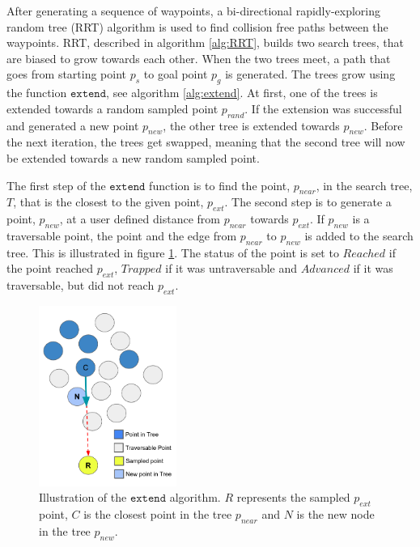After generating a sequence of waypoints, a bi-directional rapidly-exploring random tree (RRT) algorithm is used to find collision free paths between the waypoints. RRT, described in algorithm \ref{alg:RRT}, builds two search trees, that are biased to grow towards each other. When the two trees meet, a path that goes from starting point $p_s$ to goal point $p_g$ is generated. The trees grow using the function $\texttt{extend}$, see algorithm \ref{alg:extend}. At first, one of the trees is extended towards a random sampled point $p_{rand}$. If the extension was successful and generated a new point $p_{new}$, the other tree is extended towards $p_{new}$. Before the next iteration, the trees get swapped, meaning that the second tree will now be extended towards a new random sampled point. \cite{rrt}

The first step of the $\texttt{extend}$ function is to find the point, $p_{near}$, in the search tree, $T$, that is the closest to the given point, $p_{ext}$. The second step is to generate a point, $p_{new}$, at a user defined distance from $p_{near}$ towards $p_{ext}$. If $p_{new}$ is a traversable point, the point and the edge from $p_{near}$ to $p_{new}$ is added to the search tree.  This is illustrated in figure \ref{fig:extend}. The status of the point is set to $Reached$ if the point reached $p_{ext}$, $Trapped$ if it was untraversable and $Advanced$ if it was traversable, but did not reach $p_{ext}$. \cite{rrt}

\begin{figure}
    \centering
    \includegraphics[width=0.4\textwidth]{figures/extend.png}
    \caption{Illustration of the $\texttt{extend}$ algorithm. $R$ represents the sampled $p_{ext}$ point, $C$ is the closest point in the tree $p_{near}$ and $N$ is the new node in the tree $p_{new}$.}
    \label{fig:extend}
\end{figure}


